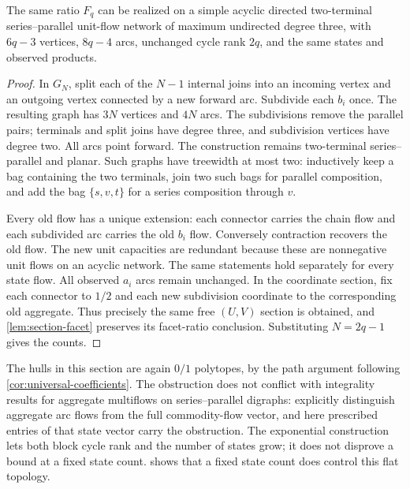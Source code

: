 \begin{corollary}\label{cor:fibonacci-simple}
The same ratio $F_q$ can be realized on a simple acyclic directed
two-terminal series--parallel unit-flow network of maximum undirected
degree three, with $6q-3$ vertices, $8q-4$ arcs, unchanged cycle
rank $2q$, and the same states and observed products.
\end{corollary}
\begin{proof}
In $G_N$, split each of the $N-1$ internal joins into an incoming
vertex and an outgoing vertex connected by a new forward arc.
Subdivide each $b_i$ once. The resulting graph has $3N$ vertices
and $4N$ arcs. The subdivisions remove the parallel pairs; terminals
and split joins have degree three, and subdivision vertices have
degree two. All arcs point forward. The construction remains
two-terminal series--parallel and planar. Such graphs have treewidth
at most two: inductively keep a bag containing the two terminals,
join two such bags for parallel composition, and add the bag
$\{s,v,t\}$ for a series composition through $v$.

Every old flow has a unique extension: each connector carries the
chain flow and each subdivided arc carries the old $b_i$ flow.
Conversely contraction recovers the old flow. The new unit capacities
are redundant because these are nonnegative unit flows on an acyclic
network. The same statements hold separately for every state flow.
All observed $a_i$ arcs remain unchanged. In the coordinate section,
fix each connector to $1/2$ and each new subdivision coordinate to
the corresponding old aggregate. Thus precisely the same free
$(U,V)$ section is obtained, and \cref{lem:section-facet} preserves
its facet-ratio conclusion. Substituting $N=2q-1$ gives the counts.
\end{proof}

The hulls in this section are again $0/1$ polytopes, by the path
argument following \cref{cor:universal-coefficients}. The obstruction
does not conflict with integrality results for aggregate multiflows
on series--parallel digraphs: \citet[Remark~1]{AlmoghrabiSkutellaWarode2026}
explicitly distinguish aggregate arc flows from the full commodity-flow
vector, and here prescribed entries of that state vector carry the
obstruction. The exponential construction lets both block cycle rank
and the number of states grow; it does not disprove a bound at a fixed
state count.  shows that a fixed state count does
control this flat topology.
